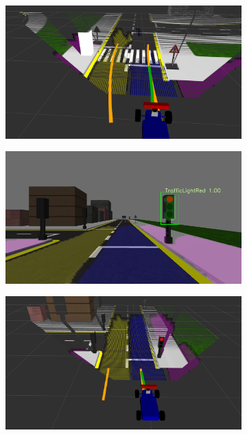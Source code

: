 \begin{figure}[h]
\begin{subfigure}[b]{0.45\linewidth}
  \end{subfigure}
  \begin{subfigure}[b]{0.45\linewidth}
      \includegraphics[width=\linewidth]{figures/experiments/cross-road-go-pc.png}
  \end{subfigure}
  \begin{subfigure}[b]{0.45\linewidth}
      \includegraphics[width=\linewidth]{figures/experiments/red-light-stop-img.png}
  \end{subfigure}
  \begin{subfigure}[b]{0.45\linewidth}
      \includegraphics[width=\linewidth]{figures/experiments/red-light-stop-pc.png}

\end{subfigure}
\end{figure}

